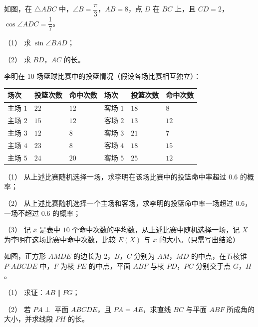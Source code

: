 \Needspace{0.4\textheight}
\begin{question}
如图，在 $\triangle ABC$ 中，$\angle B=\dfrac\pi3$，$AB=8$，点 $D$ 在 $BC$ 上，且 $CD=2$，$\cos\angle ADC=\dfrac17$。
\nopagebreak[4]
\begin{center}\end{center}
\nopagebreak[4]
（1） 求 $\sin\angle BAD$；

（2） 求 $BD$，$AC$ 的长。

\end{question}
\begin{question}
李明在 $10$ 场篮球比赛中的投篮情况（假设各场比赛相互独立）：

\begin{center}
\begin{tabular}{llllll}
\toprule
场次 & 投篮次数 & 命中次数 & 场次 & 投篮次数 & 命中次数 \\
\midrule
主场 $1$ & $22$ & $12$ & 客场 $1$ & $18$ & $8$ \\
主场 $2$ & $15$ & $12$ & 客场 $2$ & $13$ & $12$ \\
主场 $3$ & $12$ & $8$ & 客场 $3$ & $21$ & $7$ \\
主场 $4$ & $23$ & $8$ & 客场 $4$ & $18$ & $15$ \\
主场 $5$ & $24$ & $20$ & 客场 $5$ & $25$ & $12$ \\
\bottomrule
\end{tabular}
\end{center}

（1） 从上述比赛随机选择一场，求李明在该场比赛中的投篮命中率超过 $0.6$ 的概率；

（2） 从上述比赛随机选择一个主场和客场，求李明的投篮命中率一场超过 $0.6$，一场不超过 $0.6$ 的概率；

（3） 记 $\bar x$ 是表中 $10$ 个命中次数的平均数，从上述比赛中随机选择一场，记 $X$ 为李明在这场比赛中命中次数，比较 $E(X)$ 与 $\bar x$ 的大小。（只需写出结论）

\Needspace{0.4\textheight}
\end{question}
\begin{question}
如图，正方形 $AMDE$ 的边长为 $2$，$B$，$C$ 分别为 $AM$，$MD$ 的中点，在五棱锥 $P\text{-}ABCDE$ 中，$F$ 为棱 $PE$ 的中点，平面 $ABF$ 与棱 $PD$，$PC$ 分别交于点 $G$，$H$。
\nopagebreak[4]
\begin{center}\end{center}
\nopagebreak[4]
（1） 求证：$AB\parallel FG$；

（2） 若 $PA\perp$ 平面 $ABCDE$，且 $PA=AE$，求直线 $BC$ 与平面 $ABF$ 所成角的大小，并求线段 $PH$ 的长。

\end{question}
